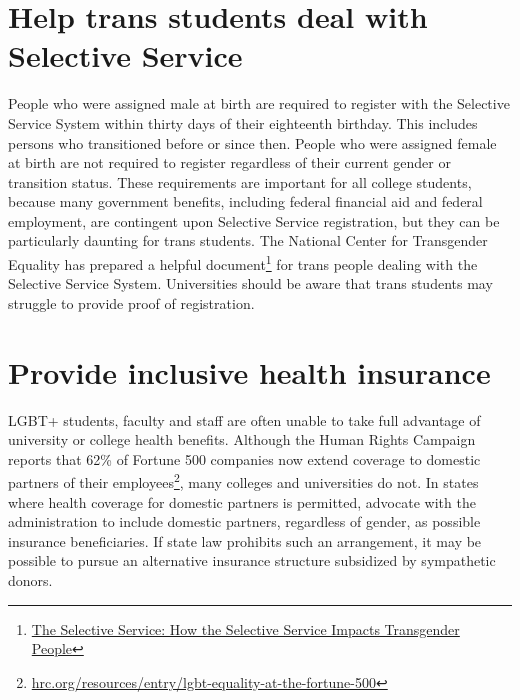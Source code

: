 \section {Help trans students deal with Selective Service}
\label{univ-trans}
People who were assigned male at birth are required to register with the Selective Service System within thirty days of their eighteenth birthday.  This includes persons who transitioned before or since then. People who were assigned female at birth are not required to register regardless of their current gender or transition status.  These requirements are important for all college students, because many government benefits, including federal financial aid and federal employment, are contingent upon Selective Service registration, but they can be particularly daunting for trans students.  The National Center for Transgender Equality has prepared a helpful document\footnote{\href{http://transequality.org/Resources/Selective_Service_only.pdf}{The Selective Service: How the Selective Service Impacts Transgender People}} for trans people dealing with the Selective Service System.  Universities should be aware that trans students may struggle to provide proof of registration.


\section {Provide inclusive health insurance}
\label{health-insurance}
LGBT+ students, faculty and staff are often unable to take full advantage of university or college health benefits.  Although the Human Rights Campaign reports that 62\% of Fortune 500 companies now extend coverage to domestic partners of their employees\footnote{\href{http://www.hrc.org/resources/entry/lgbt-equality-at-the-fortune-500}{hrc.org/resources/entry/lgbt-equality-at-the-fortune-500}}, many colleges and universities do not.  In states where health coverage for domestic partners is permitted, advocate with the administration to include domestic partners, regardless of gender, as possible insurance beneficiaries. If state law prohibits such an arrangement, it may be possible to pursue an alternative insurance structure subsidized by sympathetic donors. 

